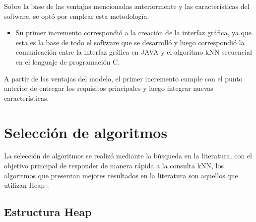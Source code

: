 Sobre la base de las ventajas mencionadas anteriormente y las características del software, se optó por emplear esta metodología. 
\begin{itemize}

\item Su primer incremento correspondió a la creación de la interfaz gráfica, ya que esta es la base de todo el software que se desarrolló y luego correspondió la comunicación entre la interfaz gráfica en JAVA y el algoritmo kNN secuencial en el lenguaje de programación C. 
\end{itemize}

A partir de las ventajas del modelo, el primer incremento cumple con el punto anterior de entregar los requisitos principales y luego integrar nuevas características.

\section{Selección de algoritmos}

La selección de algoritmos se realizó mediante la búsqueda en la literatura, con el objetivo principal de responder de manera rápida a la consulta kNN, los algoritmos que presentan mejores resultados en la literatura son aquellos que utilizan Heap \cite{knuth1973searching}.

\subsection*{Estructura Heap}\label{sec:heap}


